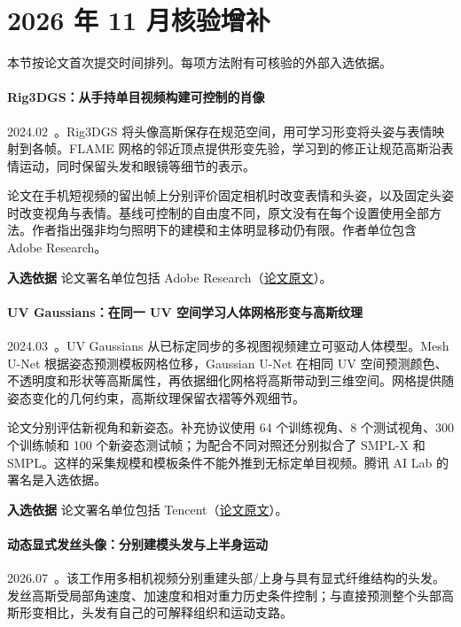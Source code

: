 \section{2026 年 11 月核验增补}

本节按论文首次提交时间排列。每项方法附有可核验的外部入选依据。

\paragraph{Rig3DGS：从手持单目视频构建可控制的肖像}
2024.02~\cite{2402_03723}。Rig3DGS 将头像高斯保存在规范空间，用可学习形变将头姿与表情映射到各帧。FLAME 网格的邻近顶点提供形变先验，学习到的修正让规范高斯沿表情运动，同时保留头发和眼镜等细节的表示。

论文在手机短视频的留出帧上分别评价固定相机时改变表情和头姿，以及固定头姿时改变视角与表情。基线可控制的自由度不同，原文没有在每个设置使用全部方法。作者指出强非均匀照明下的建模和主体明显移动仍有限。作者单位包含 Adobe Research。

\textbf{入选依据} 论文署名单位包括 Adobe Research（\href{https://arxiv.org/abs/2402.03723}{论文原文}）。

\paragraph{UV Gaussians：在同一 UV 空间学习人体网格形变与高斯纹理}
2024.03~\cite{2403_11589}。UV Gaussians 从已标定同步的多视图视频建立可驱动人体模型。Mesh U-Net 根据姿态预测模板网格位移，Gaussian U-Net 在相同 UV 空间预测颜色、不透明度和形状等高斯属性，再依据细化网格将高斯带动到三维空间。网格提供随姿态变化的几何约束，高斯纹理保留衣褶等外观细节。

论文分别评估新视角和新姿态。补充协议使用 64 个训练视角、8 个测试视角、300 个训练帧和 100 个新姿态测试帧；为配合不同对照还分别拟合了 SMPL-X 和 SMPL。这样的采集规模和模板条件不能外推到无标定单目视频。腾讯 AI Lab 的署名是入选依据。

\textbf{入选依据} 论文署名单位包括 Tencent（\href{https://arxiv.org/html/2403.11589}{论文原文}）。

\paragraph{动态显式发丝头像：分别建模头发与上半身运动}
2026.07~\cite{2607_23861}。该工作用多相机视频分别重建头部/上身与具有显式纤维结构的头发。发丝高斯受局部角速度、加速度和相对重力历史条件控制；与直接预测整个头部高斯形变相比，头发有自己的可解释组织和运动支路。


